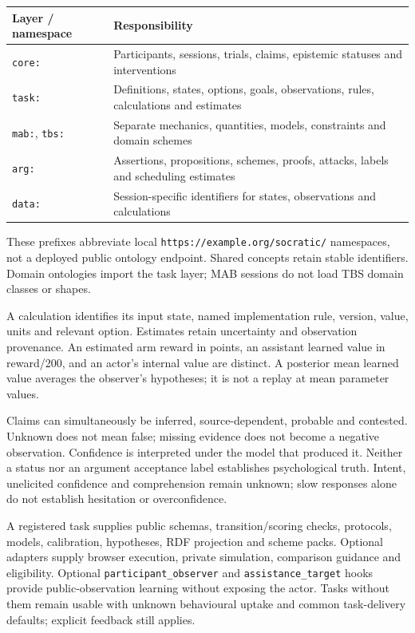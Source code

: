 \documentclass[11pt,a4paper]{article}
\begin{document}
\begin{center}
\small
\begin{tabularx}{\linewidth}{@{}lY@{}}
\toprule
Layer / namespace & Responsibility\\
\midrule
\texttt{core:} & Participants, sessions, trials, claims, epistemic statuses and interventions\\
\texttt{task:} & Definitions, states, options, goals, observations, rules, calculations and estimates\\
\texttt{mab:}, \texttt{tbs:} & Separate mechanics, quantities, models, constraints and domain schemes\\
\texttt{arg:} & Assertions, propositions, schemes, proofs, attacks, labels and scheduling estimates\\
\texttt{data:} & Session-specific identifiers for states, observations and calculations\\
\bottomrule
\end{tabularx}
\end{center}
These prefixes abbreviate local \texttt{https://example.org/socratic/} namespaces, not a deployed public ontology endpoint. Shared concepts retain stable identifiers. Domain ontologies import the task layer; MAB sessions do not load TBS domain classes or shapes.

A calculation identifies its input state, named implementation rule, version, value, units and relevant option. Estimates retain uncertainty and observation provenance. An estimated arm reward in points, an assistant learned value in reward/200, and an actor's internal value are distinct. A posterior mean learned value averages the observer's hypotheses; it is not a replay at mean parameter values.

Claims can simultaneously be inferred, source-dependent, probable and contested. Unknown does not mean false; missing evidence does not become a negative observation. Confidence is interpreted under the model that produced it. Neither a status nor an argument acceptance label establishes psychological truth. Intent, unelicited confidence and comprehension remain unknown; slow responses alone do not establish hesitation or overconfidence.

A registered task supplies public schemas, transition/scoring checks, protocols, models, calibration, hypotheses, RDF projection and scheme packs. Optional adapters supply browser execution, private simulation, comparison guidance and eligibility. Optional \texttt{participant\_observer} and \texttt{assistance\_target} hooks provide public-observation learning without exposing the actor. Tasks without them remain usable with unknown behavioural uptake and common task-delivery defaults; explicit feedback still applies.
\end{document}
